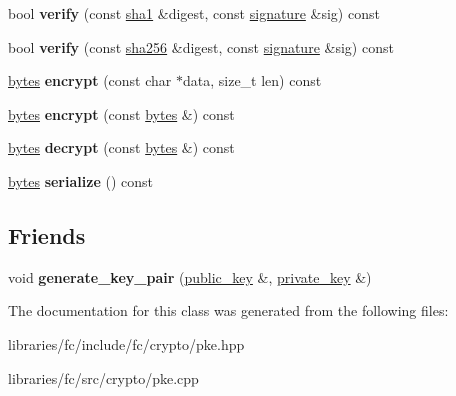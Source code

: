 \begin{DoxyCompactItemize}
\item 
\mbox{\label{classfc_1_1public__key_aadd02c26a13e12b5934680c997b93470}} 
bool {\bfseries verify} (const \mbox{\hyperlink{classfc_1_1sha1}{sha1}} \&digest, const \mbox{\hyperlink{classstd_1_1vector}{signature}} \&sig) const
\item 
\mbox{\label{classfc_1_1public__key_a1cfc06363431d788e60ea4cfe5290c87}} 
bool {\bfseries verify} (const \mbox{\hyperlink{classfc_1_1sha256}{sha256}} \&digest, const \mbox{\hyperlink{classstd_1_1vector}{signature}} \&sig) const
\item 
\mbox{\label{classfc_1_1public__key_a1f6bcd79a16dbed75bfb2cc8e1c40509}} 
\mbox{\hyperlink{classstd_1_1vector}{bytes}} {\bfseries encrypt} (const char $\ast$data, size\+\_\+t len) const
\item 
\mbox{\label{classfc_1_1public__key_a16cef8805a0a977135fbdbac890e11ad}} 
\mbox{\hyperlink{classstd_1_1vector}{bytes}} {\bfseries encrypt} (const \mbox{\hyperlink{classstd_1_1vector}{bytes}} \&) const
\item 
\mbox{\label{classfc_1_1public__key_a60336ba1fea99c80a2d324e2e5a65513}} 
\mbox{\hyperlink{classstd_1_1vector}{bytes}} {\bfseries decrypt} (const \mbox{\hyperlink{classstd_1_1vector}{bytes}} \&) const
\item 
\mbox{\label{classfc_1_1public__key_a3073f8c9de4d0fc904672efecff4d03a}} 
\mbox{\hyperlink{classstd_1_1vector}{bytes}} {\bfseries serialize} () const
\end{DoxyCompactItemize}
\subsection*{Friends}
\begin{DoxyCompactItemize}
\item 
\mbox{\label{classfc_1_1public__key_a4565b23872cef7fbf06ebd2749c89348}} 
void {\bfseries generate\+\_\+key\+\_\+pair} (\mbox{\hyperlink{classfc_1_1public__key}{public\+\_\+key}} \&, \mbox{\hyperlink{classfc_1_1private__key}{private\+\_\+key}} \&)
\end{DoxyCompactItemize}


The documentation for this class was generated from the following files\+:\begin{DoxyCompactItemize}
\item 
libraries/fc/include/fc/crypto/pke.\+hpp\item 
libraries/fc/src/crypto/pke.\+cpp\end{DoxyCompactItemize}

